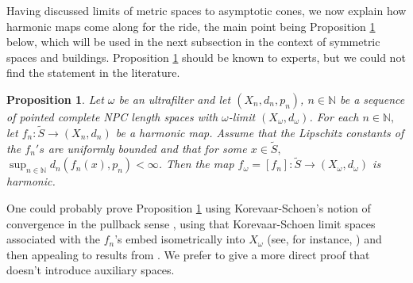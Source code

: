 \documentclass[10pt]{amsart}
\newtheorem{prop}[thm]{Proposition}
\theoremstyle{definition}
\begin{document}
Having discussed limits of metric spaces to asymptotic cones, we now explain how harmonic maps come along for the ride, the main point being Proposition \ref{prop: hmapsconvergence} below, which will be used in the next subsection in the context of symmetric spaces and buildings. Proposition \ref{prop: hmapsconvergence} should be known to experts, but we could not find the statement in the literature.
\begin{prop}\label{prop: hmapsconvergence}
    Let $\omega$ be an ultrafilter and let $(X_n,d_n,p_n)$, $n\in\mathbb{N}$ be a sequence of pointed complete NPC length spaces with $\omega$-limit $(X_\omega,d_\omega)$. For each $n\in\mathbb{N},$ let $f_n:\tilde{S}\to (X_n,d_n)$ be a harmonic map. Assume that the Lipschitz constants of the $f_n's$ are uniformly bounded and that for some $x\in \tilde{S},$ $\sup_{n\in\mathbb{N}}d_n(f_n(x),p_n)<\infty$. Then the map $f_\omega=[f_n]:\tilde{S}\to (X_\omega,d_\omega)$ is harmonic.
\end{prop}
One could probably prove Proposition \ref{prop: hmapsconvergence} using Korevaar-Schoen's notion of convergence in the pullback sense \cite[Definition 3.3]{KS2}, using that Korevaar-Schoen limit spaces associated with the $f_n$'s embed isometrically into $X_\omega$ (see, for instance, \cite[section 2.7]{BDM}) and then appealing to results from \cite[section 3]{KS}. We prefer to give a more direct proof that doesn't introduce auxiliary spaces. 
\end{document}

